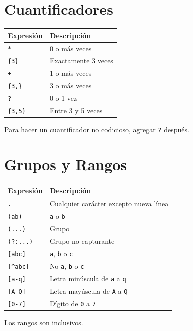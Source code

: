 \documentclass[
  letterpaper,
  DIV=11,
  numbers=noendperiod]{scrreprt}
\begin{document}
\chapter{Cuantificadores}\label{cuantificadores}

\begin{longtable}[]{@{}ll@{}}
\toprule\noalign{}
Expresión & Descripción \\
\midrule\noalign{}
\endhead
\bottomrule\noalign{}
\endlastfoot
\texttt{*} & 0 o más veces \\
\texttt{\{3\}} & Exactamente 3 veces \\
\texttt{+} & 1 o más veces \\
\texttt{\{3,\}} & 3 o más veces \\
\texttt{?} & 0 o 1 vez \\
\texttt{\{3,5\}} & Entre 3 y 5 veces \\
\end{longtable}

Para hacer un cuantificador no codicioso, agregar \texttt{?} después.

\chapter{Grupos y Rangos}\label{grupos-y-rangos}

\begin{longtable}[]{@{}ll@{}}
\toprule\noalign{}
Expresión & Descripción \\
\midrule\noalign{}
\endhead
\bottomrule\noalign{}
\endlastfoot
\texttt{.} & Cualquier carácter excepto nueva línea \\
\texttt{(a\textbar{}b)} & \texttt{a} o \texttt{b} \\
\texttt{(...)} & Grupo \\
\texttt{(?:...)} & Grupo no capturante \\
\texttt{{[}abc{]}} & \texttt{a}, \texttt{b} o \texttt{c} \\
\texttt{{[}\^{}abc{]}} & No \texttt{a}, \texttt{b} o \texttt{c} \\
\texttt{{[}a-q{]}} & Letra minúscula de \texttt{a} a \texttt{q} \\
\texttt{{[}A-Q{]}} & Letra mayúscula de \texttt{A} a \texttt{Q} \\
\texttt{{[}0-7{]}} & Dígito de \texttt{0} a \texttt{7} \\
\end{longtable}

Los rangos son inclusivos. \textbar{}
\end{document}
